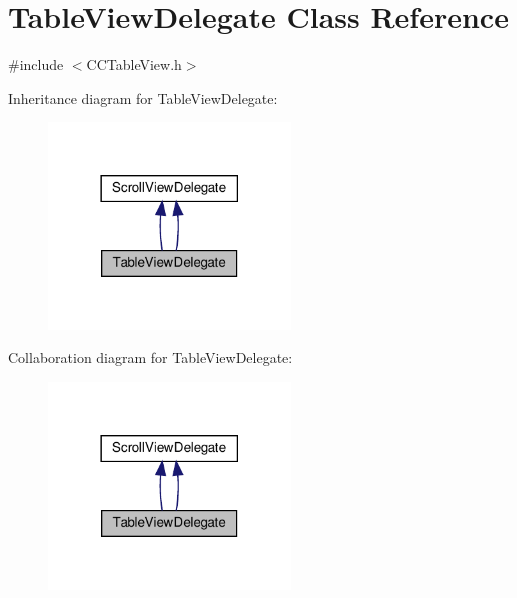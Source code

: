 \hypertarget{classTableViewDelegate}{}\section{Table\+View\+Delegate Class Reference}
\label{classTableViewDelegate}


{\ttfamily \#include $<$C\+C\+Table\+View.\+h$>$}



Inheritance diagram for Table\+View\+Delegate\+:
\nopagebreak
\begin{figure}[H]
\begin{center}
\leavevmode
\includegraphics[width=182pt]{classTableViewDelegate__inherit__graph}
\end{center}
\end{figure}


Collaboration diagram for Table\+View\+Delegate\+:
\nopagebreak
\begin{figure}[H]
\begin{center}
\leavevmode
\includegraphics[width=182pt]{classTableViewDelegate__coll__graph}
\end{center}
\end{figure}

